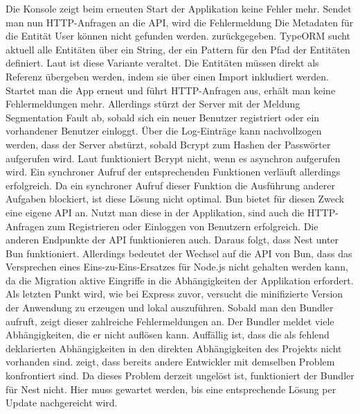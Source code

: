 \noindent
Die Konsole zeigt beim erneuten Start der Applikation keine Fehler mehr. Sendet man nun HTTP-Anfragen an die API, wird die Fehlermeldung \glqq Die Metadaten für die Entität User können nicht gefunden werden.\grqq{} zurückgegeben. TypeORM sucht aktuell alle Entitäten über ein String, der ein Pattern für den Pfad der Entitäten definiert. Laut \cite{TypeORM.2021} ist diese Variante veraltet. Die Entitäten müssen direkt als Referenz übergeben werden, indem sie über einen Import inkludiert werden. \newline
Startet man die App erneut und führt HTTP-Anfragen aus, erhält man keine Fehlermeldungen mehr. Allerdings stürzt der Server mit der Meldung \glqq Segmentation Fault\grqq{} ab, sobald sich ein neuer Benutzer registriert oder ein vorhandener Benutzer einloggt. Über die Log-Einträge kann nachvollzogen werden, dass der Server abstürzt, sobald Bcrypt zum Hashen der Passwörter aufgerufen wird. Laut \cite{Sumner.2023} funktioniert Bcrypt nicht, wenn es asynchron aufgerufen wird. Ein synchroner Aufruf der entsprechenden Funktionen verläuft allerdings erfolgreich. Da ein synchroner Aufruf dieser Funktion die Ausführung anderer Aufgaben blockiert, ist diese Lösung nicht optimal. Bun bietet für diesen Zweck eine eigene API an. Nutzt man diese in der Applikation, sind auch die HTTP-Anfragen zum Registrieren oder Einloggen von Benutzern erfolgreich. Die anderen Endpunkte der API funktionieren auch. Daraus folgt, dass Nest unter Bun funktioniert. Allerdings bedeutet der Wechsel auf die API von Bun, dass das Versprechen eines Eins-zu-Eins-Ersatzes für Node.js nicht gehalten werden kann, da die Migration aktive Eingriffe in die Abhängigkeiten der Applikation erfordert.\\

\noindent
Als letzten Punkt wird, wie bei Express zuvor, versucht die minifizierte Version der Anwendung zu erzeugen und lokal auszuführen. Sobald man den Bundler aufruft, zeigt dieser zahlreiche Fehlermeldungen an. Der Bundler meldet viele Abhängigkeiten, die er nicht auflösen kann.  Auffällig ist, dass die als fehlend deklarierten Abhängigkeiten in den direkten Abhängigkeiten des Projekts nicht vorhanden sind. \cite{Postek.2023} zeigt, dass bereits andere Entwickler mit demselben Problem konfrontiert sind. Da dieses Problem derzeit ungelöst ist, funktioniert der Bundler für Nest nicht. Hier muss gewartet werden, bis eine entsprechende Lösung per Update nachgereicht wird.

